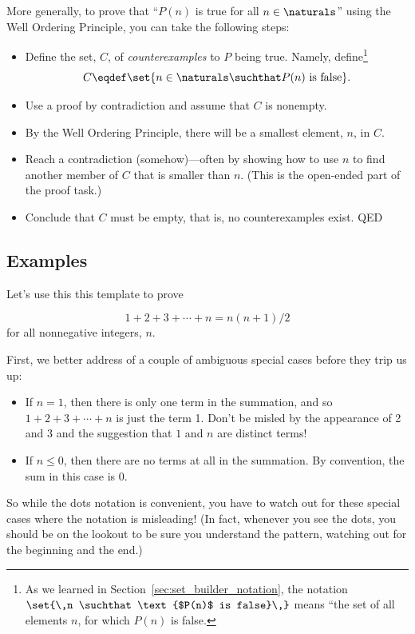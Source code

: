 More generally, to prove that ``$P(n)$ is true for all
$n\in \naturals$'' using the Well Ordering Principle, you can take the
following steps:
\begin{itemize}

\item Define the set, $C$, of \emph{counterexamples} to $P$ being
  true.  Namely, define\footnote{As we learned in
    Section~\ref{sec:set_builder_notation}, the notation 
    $\set{\,n \suchthat \text{$P(n)$ is false}\,}$
    means ``the set of all elements $n$, for which $P(n)$ is false.}
\[
C \eqdef \set{n\in\naturals \suchthat P(n) \text{ is false}}.
\]

\item Use a proof by contradiction and assume that $C$ is nonempty.

\item By the Well Ordering Principle, there will be a smallest
      element, $n$, in $C$.

\item Reach a contradiction (somehow)---often by showing how to use $n$
to find another member of $C$ that is smaller than $n$.  (This is the
open-ended part of the proof task.)

\item Conclude that $C$ must be empty, that is, no counterexamples exist.
QED

\end{itemize}


\subsection{Examples}

Let's use this this template to prove %

\begin{theorem*}  %
\begin{equation}\label{sum1n}
1 + 2 + 3 + \cdots + n = n(n+1)/2
\end{equation}
for all nonnegative integers, $n$.
\end{theorem*}

First, we better address of a couple of ambiguous special
cases before they trip us up:
%
\begin{itemize}
%
\item If $n = 1$, then there is only one term in the summation, and so $1
  + 2 + 3 + \cdots + n$ is just the term 1.  Don't be misled by the
  appearance of 2 and 3 and the suggestion that $1$ and $n$ are distinct
  terms!
%
\item If $n \leq 0$, then there are no terms at all in the summation.  By
convention, the sum in this case is 0.
%
\end{itemize}
%
So while the dots notation is convenient, you have to watch out for these
special cases where the notation is misleading!  (In fact, whenever you
see the dots, you should be on the lookout to be sure you understand the
pattern, watching out for the beginning and the end.)

